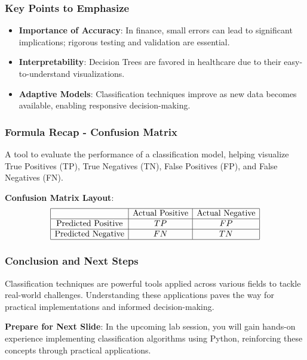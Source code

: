 \documentclass[aspectratio=169]{beamer}
\begin{document}
\begin{frame}[fragile]
    \frametitle{Key Points to Emphasize}
    \begin{itemize}
        \item \textbf{Importance of Accuracy}: In finance, small errors can lead to significant implications; rigorous testing and validation are essential.
        \item \textbf{Interpretability}: Decision Trees are favored in healthcare due to their easy-to-understand visualizations.
        \item \textbf{Adaptive Models}: Classification techniques improve as new data becomes available, enabling responsive decision-making.
    \end{itemize}
\end{frame}

\begin{frame}[fragile]
    \frametitle{Formula Recap - Confusion Matrix}
    A tool to evaluate the performance of a classification model, helping visualize True Positives (TP), True Negatives (TN), False Positives (FP), and False Negatives (FN).

    \begin{center}
        \textbf{Confusion Matrix Layout}:
        \begin{equation}
        \begin{array}{|c|c|c|}
        \hline
        & \text{Actual Positive} & \text{Actual Negative} \\
        \hline
        \text{Predicted Positive} & TP & FP \\
        \hline
        \text{Predicted Negative} & FN & TN \\
        \hline
        \end{array}
        \end{equation}
    \end{center}
\end{frame}

\begin{frame}[fragile]
    \frametitle{Conclusion and Next Steps}
    Classification techniques are powerful tools applied across various fields to tackle real-world challenges. Understanding these applications paves the way for practical implementations and informed decision-making.

    \textbf{Prepare for Next Slide}: 
    In the upcoming lab session, you will gain hands-on experience implementing classification algorithms using Python, reinforcing these concepts through practical applications.
\end{frame}
\end{document}
